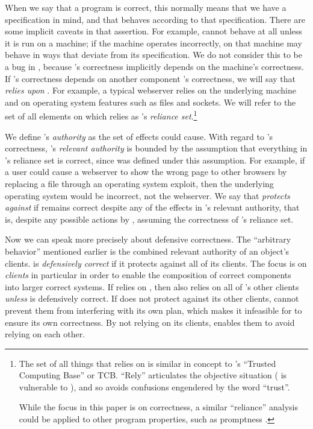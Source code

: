 \documentclass{llncs}
\begin{document}
When we say that a program  is correct, this normally means
that we have a specification in mind, and that  behaves
according to that specification.  There are some implicit caveats in
that assertion. For example,  cannot behave at all unless it
is run on a machine; if the machine operates incorrectly,  on
that machine may behave in ways that deviate from its specification. 
We do not consider this to be a bug in , because 's
correctness implicitly depends on the machine's correctness.  If
's correctness depends on another component 's
correctness, we will say that  \emph{relies upon} .
For example, a typical webserver relies on the underlying machine and
on operating system features such as files and sockets.  We will refer
to the set of all elements on which  relies as 's
\emph{reliance set}.\footnote{
%
     The set of all things that  relies on is similar in
     concept to 's ``Trusted Computing Base'' or TCB. ``Rely''
     articulates the objective situation ( is vulnerable to
     ), and so avoids confusions engendered by the word
     ``trust''.
     
     While the focus in this paper is on correctness, a similar ``reliance''
     analysis could be applied to other program properties, such as
     promptness \cite{hardy:keykos}.}

We define 's \emph{authority} as the set of effects 
could cause.  With regard to 's correctness, 's
\emph{relevant authority} is bounded by the assumption that everything
in 's reliance set is correct, since  was defined
under this assumption. For example, if a user could cause a webserver
to show the wrong page to other browsers by replacing a file through
an operating system exploit, then the underlying operating system
would be incorrect, not the webserver. We say that 
\emph{protects against}  if  remains correct despite
any of the effects in 's relevant authority, that is, despite
any possible actions by , assuming the correctness of
's reliance set.

Now we can speak more precisely about defensive correctness. The
``arbitrary behavior'' mentioned earlier is the combined relevant
authority of an object's clients.  is \emph{defensively
correct} if it protects against all of its clients.  The focus is on
\emph{clients} in particular in order to enable the composition of
correct components into larger correct systems. If  relies on
, then  also relies on all of 's other clients
\emph{unless}  is defensively correct.  If  does not
protect against its other clients,  cannot prevent them from
interfering with its own plan, which makes it infeasible for 
to ensure its own correctness.  By not relying on its clients,
 enables them to avoid relying on each other.  
\end{document}
